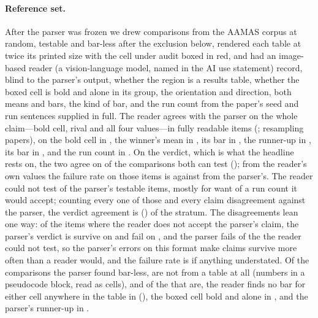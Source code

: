 \documentclass[sigconf,anonymous]{aamas}
\begin{document}
\paragraph{Reference set.} After the parser was frozen we drew \nGDrawnN{}
comparisons from the AAMAS corpus at random, \nGTestableN{} testable and
\nGNoBarN{} bar-less after the exclusion below, rendered each table at twice
its printed size with the cell under audit boxed in red, and had an
image-based reader (a vision-language model, named in the AI use statement)
record, blind to the parser's output, whether the region is a results table,
whether the boxed cell is bold and alone in its group, the orientation and
direction, both means and bars, the kind of bar, and the run count from the
paper's seed and run sentences supplied in full. The reader agrees with the
parser on the whole claim---bold cell, rival and all four values---in
\nGClaimFrac{} fully readable items (\nGClaim{}; \nGClaimPaperCi{}
resampling papers), on the bold cell in \nGBoldCellFrac{}, the winner's mean
in \nGWinnerMeanFrac{}, its bar in \nGWinnerDispFrac{}, the runner-up in
\nGRunnerMeanFrac{}, its bar in \nGRunnerDispFrac{}, and the run count in
\nGNRunsFrac{}. On the verdict, which is what the headline rests on, the two
agree on \nGVerdictFrac{} of the comparisons both can test (\nGVerdict{});
from the reader's own values the failure rate on those items is
\nGFailReader{} against \nGFailPipe{} from the parser's. The reader could
not test \nGUntestableN{} of the parser's testable items, mostly for want of
a run count it would accept; counting every one of those and every claim
disagreement against the parser, the verdict agreement is
\nGVerdictFullFrac{} (\nGVerdictFullPct{}) of the stratum. The
disagreements lean one way: of the \nGDisagreeN{} items where the reader
does not accept the parser's claim, the parser's verdict is survive on
\nGDisagreeSurvive{} and fail on \nGDisagreeFail{}, and the parser fails
\nGUntestablePipeFails{} of the \nGUntestableN{} the reader could not test,
so the parser's errors on this format make claims survive more often than a
reader would, and the failure rate is if anything understated. Of the \nGNoBarN{} comparisons the parser found
bar-less, \nGNoBarNotTable{} are not from a table at all (numbers in a
pseudocode block, read as cells), and of the \nGNoBarResultsTableFrac{}
that are, the reader finds no bar for either cell anywhere in the table in
\nGNoBarAbsentFrac{} (\nGNoBarAbsent{}), the boxed cell bold and alone in
\nGNoBarBoldFrac{}, and the parser's runner-up in \nGNoBarRunnerFrac{}.
\end{document}
